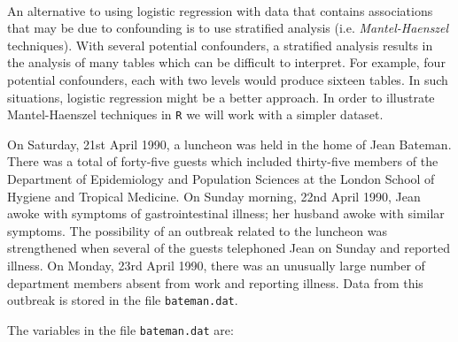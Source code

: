 \documentclass[12pt,a4paper]{book}
\theoremstyle{definition}
\theoremstyle{definition}
\theoremstyle{definition}
\theoremstyle{remark}
\begin{document}
~

An alternative to using logistic regression with data that contains
associations that may be due to confounding is to use stratified
analysis (i.e. \emph{Mantel-Haenszel} techniques). With several
potential confounders, a stratified analysis results in the analysis of
many tables which can be difficult to interpret. For example, four
potential confounders, each with two levels would produce sixteen
tables. In such situations, logistic regression might be a better
approach. In order to illustrate Mantel-Haenszel techniques in
\texttt{R} we will work with a simpler dataset.

On Saturday, 21st April 1990, a luncheon was held in the home of Jean
Bateman. There was a total of forty-five guests which included
thirty-five members of the Department of Epidemiology and Population
Sciences at the London School of Hygiene and Tropical Medicine. On
Sunday morning, 22nd April 1990, Jean awoke with symptoms of
gastrointestinal illness; her husband awoke with similar symptoms. The
possibility of an outbreak related to the luncheon was strengthened when
several of the guests telephoned Jean on Sunday and reported illness. On
Monday, 23rd April 1990, there was an unusually large number of
department members absent from work and reporting illness. Data from
this outbreak is stored in the file \texttt{bateman.dat}.

The variables in the file \texttt{bateman.dat} are:

~
\end{document}
